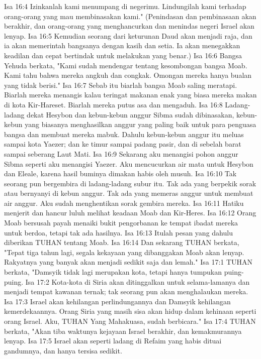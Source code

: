 Isa 16:4  Izinkanlah kami menumpang di negerimu. Lindungilah kami terhadap orang-orang yang mau membinasakan kami." (Penindasan dan pembinasaan akan berakhir, dan orang-orang yang menghancurkan dan menindas negeri Israel akan lenyap.
Isa 16:5  Kemudian seorang dari keturunan Daud akan menjadi raja, dan ia akan memerintah bangsanya dengan kasih dan setia. Ia akan menegakkan keadilan dan cepat bertindak untuk melakukan yang benar.)
Isa 16:6  Bangsa Yehuda berkata, "Kami sudah mendengar tentang kesombongan bangsa Moab. Kami tahu bahwa mereka angkuh dan congkak. Omongan mereka hanya bualan yang tidak berisi."
Isa 16:7  Sebab itu biarlah bangsa Moab saling meratapi. Biarlah mereka menangis kalau teringat makanan enak yang biasa mereka makan di kota Kir-Hareset. Biarlah mereka putus asa dan mengaduh.
Isa 16:8  Ladang-ladang dekat Hesybon dan kebun-kebun anggur Sibma sudah dibinasakan, kebun-kebun yang biasanya menghasilkan anggur yang paling baik untuk para penguasa bangsa dan membuat mereka mabuk. Dahulu kebun-kebun anggur itu meluas sampai kota Yaezer; dan ke timur sampai padang pasir, dan di sebelah barat sampai seberang Laut Mati.
Isa 16:9  Sekarang aku menangisi pohon anggur Sibma seperti aku menangisi Yaezer. Aku mencucurkan air mata untuk Hesybon dan Eleale, karena hasil buminya dimakan habis oleh musuh.
Isa 16:10  Tak seorang pun bergembira di ladang-ladang subur itu. Tak ada yang berpekik sorak atau bernyanyi di kebun anggur. Tak ada yang memeras anggur untuk membuat air anggur. Aku sudah menghentikan sorak gembira mereka.
Isa 16:11  Hatiku menjerit dan hancur luluh melihat keadaan Moab dan Kir-Heres.
Isa 16:12  Orang Moab bersusah payah menaiki bukit pengorbanan ke tempat ibadat mereka untuk berdoa, tetapi tak ada hasilnya.
Isa 16:13  Itulah pesan yang dahulu diberikan TUHAN tentang Moab.
Isa 16:14  Dan sekarang TUHAN berkata, "Tepat tiga tahun lagi, segala kekayaan yang dibanggakan Moab akan lenyap. Rakyatnya yang banyak akan menjadi sedikit saja dan lemah."
Isa 17:1  TUHAN berkata, "Damsyik tidak lagi merupakan kota, tetapi hanya tumpukan puing-puing.
Isa 17:2  Kota-kota di Siria akan ditinggalkan untuk selama-lamanya dan menjadi tempat kawanan ternak; tak seorang pun akan menghalaukan mereka.
Isa 17:3  Israel akan kehilangan perlindungannya dan Damsyik kehilangan kemerdekaannya. Orang Siria yang masih sisa akan hidup dalam kehinaan seperti orang Israel. Aku, TUHAN Yang Mahakuasa, sudah berbicara."
Isa 17:4  TUHAN berkata, "Akan tiba waktunya kejayaan Israel berakhir, dan kemakmurannya lenyap.
Isa 17:5  Israel akan seperti ladang di Refaim yang habis dituai gandumnya, dan hanya tersisa sedikit.
